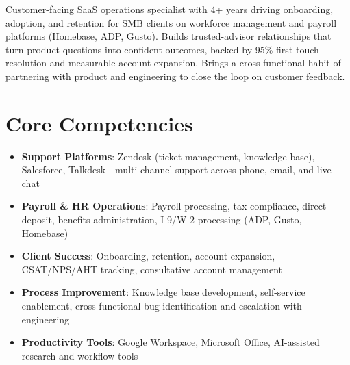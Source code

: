 \documentclass[11pt,a4paper,sans]{moderncv}
\begin{document}
\makecvtitle


\vspace{6pt}
\small{Customer-facing SaaS operations specialist with 4+ years driving onboarding, adoption, and retention for SMB clients on workforce management and payroll platforms (Homebase, ADP, Gusto). Builds trusted-advisor relationships that turn product questions into confident outcomes, backed by 95\% first-touch resolution and measurable account expansion. Brings a cross-functional habit of partnering with product and engineering to close the loop on customer feedback.}


\section{Core Competencies}
\vspace{1pt}
\begin{itemize}

\item \textbf{Support Platforms}: Zendesk (ticket management, knowledge base), Salesforce, Talkdesk - multi-channel support across phone, email, and live chat

\item \textbf{Payroll \& HR Operations}: Payroll processing, tax compliance, direct deposit, benefits administration, I-9/W-2 processing (ADP, Gusto, Homebase)

\item \textbf{Client Success}: Onboarding, retention, account expansion, CSAT/NPS/AHT tracking, consultative account management

\item \textbf{Process Improvement}: Knowledge base development, self-service enablement, cross-functional bug identification and escalation with engineering

\item \textbf{Productivity Tools}: Google Workspace, Microsoft Office, AI-assisted research and workflow tools

\end{itemize}

\end{document}
